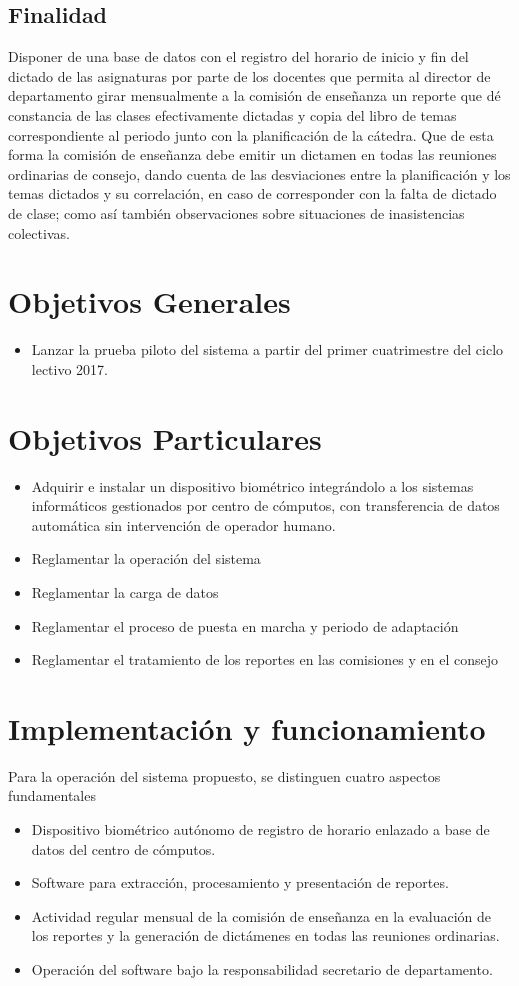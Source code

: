 \documentclass[a4paper, 11pt]{article} %
\begin{document}
\subsection*{Finalidad}
Disponer de una base de datos con el registro del horario de inicio y fin del dictado de las asignaturas por parte de los docentes que permita al director de departamento girar mensualmente a la comisión de enseñanza un reporte que dé constancia de las clases efectivamente dictadas y copia del libro de temas correspondiente al periodo junto con la planificación de la cátedra.
Que de esta forma la comisión de enseñanza debe emitir un dictamen en todas las reuniones ordinarias de consejo, dando cuenta de las desviaciones entre la planificación y los temas dictados y su correlación, en caso de corresponder con la falta de dictado de clase; como así también observaciones sobre situaciones de inasistencias colectivas.
\section*{Objetivos Generales}
\begin{itemize}
	\item Lanzar la prueba piloto del sistema a partir del primer cuatrimestre del ciclo lectivo 2017.
\end{itemize}
\section*{Objetivos Particulares}
\begin{itemize}
	\item Adquirir e instalar un dispositivo biométrico integrándolo a los sistemas informáticos gestionados por centro de cómputos, con transferencia de datos automática sin intervención de operador humano.
	\item Reglamentar la operación del sistema
	\item Reglamentar la carga de datos
	\item Reglamentar el proceso de puesta en marcha y periodo de adaptación
	\item Reglamentar el tratamiento de los reportes en las comisiones y en el consejo
\end{itemize}
\section*{Implementación y funcionamiento}
Para la operación del sistema propuesto, se distinguen cuatro aspectos fundamentales
\begin{itemize}
	\item Dispositivo biométrico autónomo de registro de horario enlazado a base de datos del centro de cómputos.
	\item Software para extracción, procesamiento y presentación de reportes.
	\item Actividad regular mensual de la comisión de enseñanza en la evaluación de los reportes y la generación de dictámenes en todas las reuniones ordinarias.
	\item Operación del software bajo la responsabilidad secretario de departamento.
\end{itemize}
\end{document}
